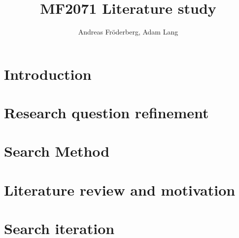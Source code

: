 \documentclass[a4paper, 12pt]{article}
\title{MF2071 Literature study}
\author{Andreas Fr\"{o}derberg, Adam Lang}
\begin{document}
\maketitle
\pagebreak
\section*{Introduction}


\section*{Research question refinement}


\section*{Search Method}


\section*{Literature review and motivation}


\pagebreak
\section*{Search iteration}


\pagebreak


\end{document}
